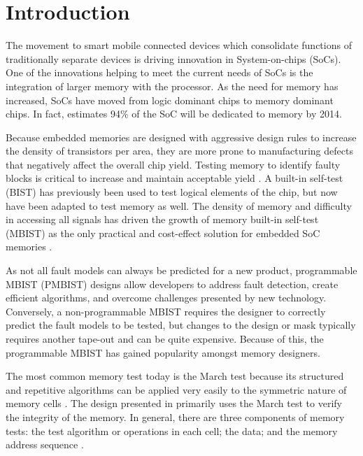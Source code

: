 \chapter{Introduction}
\label{chap:introduction}
The movement to smart mobile connected devices which consolidate functions of traditionally separate devices is driving innovation in System-on-chips (SoCs).  One of the innovations helping to meet the current needs of SoCs is the integration of larger memory with the processor.  As the need for memory has increased, SoCs have moved from logic dominant chips to memory dominant chips.  In fact, \cite{1327984} estimates 94\% of the SoC will be dedicated to memory by 2014.  

Because embedded memories are designed with aggressive design rules to increase the density of transistors per area, they are more prone to manufacturing defects that negatively affect the overall chip yield.  Testing memory to identify faulty blocks is critical to increase and maintain acceptable yield \cite{1395663}. 
A built-in self-test (BIST) has previously been used to test logical elements of the chip, but now have been adapted to test memory as well.  The density of memory and difficulty in accessing all signals has driven the growth of memory built-in self-test (MBIST) as the only practical and cost-effect solution for embedded SoC memories \cite{5875994}.  

As not all fault models can always be predicted for a new product, programmable MBIST (PMBIST) designs allow developers to address fault detection, create efficient algorithms, and overcome challenges presented by new technology.  Conversely, a non-programmable MBIST requires the designer to correctly predict the fault models to be tested, but changes to the design or mask typically requires another tape-out and can be quite expensive.  Because of this, the programmable MBIST has gained popularity amongst memory designers. 

The most common memory test today is the March test because its structured and repetitive algorithms can be applied very easily to the symmetric nature of memory cells \cite{1675150}.  The design presented in \cite{1584083} primarily uses the March test to verify the integrity of the memory.  In general, there are three components of memory tests: the test algorithm or operations in each cell; the data; and the memory address sequence \cite{5993815}.  

